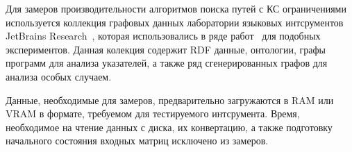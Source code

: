\begin{table}[h]
\begin{center}
\caption{Разреженные матричные данные}
\label{table:sparse_matrices}
{}
\end{center}
\end{table}

Для замеров производительности алгоритмов поиска путей с КС ограничениями используется коллекция графовых данных лаборатории языковых интсрументов JetBrains Research~\cite{net:cfpq_data}, которая использовались в ряде работ~\cite{inproceedings:matrix_cfpq, inproceedings:cfpq_matrix_evaluation, inbook:kronecker_cfpq_adbis, inproceedings:cfqp_matrix_with_single_source} для подобных экспериментов. Данная колекция содержит RDF данные, онтологии, графы программ для анализа указателей, а также ряд сгенерированных графов для анализа особых случаем. 

Данные, необходимые для замеров, предварительно загружаются в RAM или VRAM в формате, требуемом для тестируемого интсрумента. Время, необходимое на чтение данных с диска, их конвертацию, а также подготовку начального состояния входных матриц исключено из замеров. 

